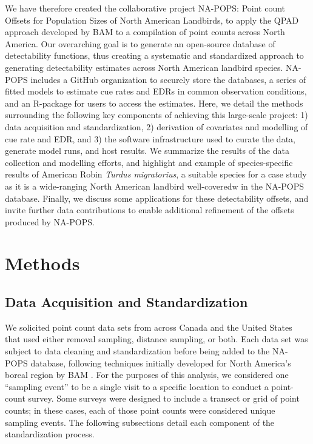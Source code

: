 \par We have therefore created the collaborative project NA-POPS: Point count Offsets for Population Sizes of North American Landbirds, to apply the QPAD approach developed by BAM to a compilation of point counts across North America. Our overarching goal is to generate an open-source database of detectability functions, thus creating a systematic and standardized approach to generating detectability estimates across North American landbird species. NA-POPS includes a GitHub organization \citep{blischak_quick_2016, crystal-ornelas_not_2022} to securely store the databases, a series of fitted models to estimate cue rates and EDRs in common observation conditions, and an R-package for users to access the estimates. Here, we detail the methods surrounding the following key components of achieving this large-scale project: 1) data acquisition and standardization, 2) derivation of covariates and modelling of cue rate and EDR, and 3) the software infrastructure used to curate the data, generate model runs, and host results. We summarize the results of the data collection and modelling efforts, and highlight and example of species-specific results of American Robin \textit{Turdus migratorius}, a suitable species for a case study as it is a wide-ranging North American landbird well-coveredw in the NA-POPS database. Finally, we discuss some applications for these detectability offsets, and invite further data contributions to enable additional refinement of the offsets produced by NA-POPS.


\section{Methods}
\subsection{Data Acquisition and Standardization}
\par We solicited point count data sets from across Canada and the United States that used either removal sampling, distance sampling, or both. Each data set was subject to data cleaning and standardization before being added to the NA-POPS database, following techniques initially developed for North America’s boreal region by BAM \citep{cumming_toward_2010, barker_ecological_2015}. For the purposes of this analysis, we considered one “sampling event” to be a single visit to a specific location to conduct a point-count survey. Some surveys were designed to include a transect or grid of point counts; in these cases, each of those point counts were considered unique sampling events. The following subsections detail each component of the standardization process.

